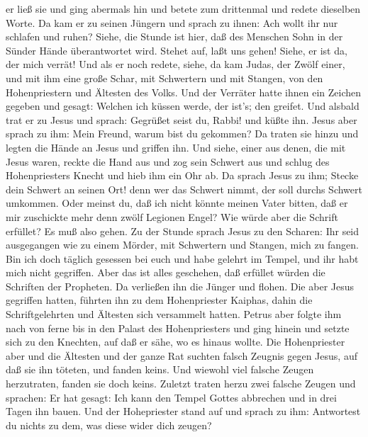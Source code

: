 er ließ sie und ging abermals hin und betete zum drittenmal und redete
dieselben Worte.  Da kam er zu seinen Jüngern und sprach zu
ihnen: Ach wollt ihr nur schlafen und ruhen? Siehe, die Stunde ist hier,
daß des Menschen Sohn in der Sünder Hände überantwortet wird.
 Stehet auf, laßt uns gehen! Siehe, er ist da, der mich
verrät!  Und als er noch redete, siehe, da kam Judas, der
Zwölf einer, und mit ihm eine große Schar, mit Schwertern und mit
Stangen, von den Hohenpriestern und Ältesten des Volks. 
Und der Verräter hatte ihnen ein Zeichen gegeben und gesagt: Welchen ich
küssen werde, der ist's; den greifet.  Und alsbald trat er
zu Jesus und sprach: Gegrüßet seist du, Rabbi! und küßte ihn.
 Jesus aber sprach zu ihm: Mein Freund, warum bist du
gekommen? Da traten sie hinzu und legten die Hände an Jesus und griffen
ihn.  Und siehe, einer aus denen, die mit Jesus waren,
reckte die Hand aus und zog sein Schwert aus und schlug des
Hohenpriesters Knecht und hieb ihm ein Ohr ab.  Da sprach
Jesus zu ihm; Stecke dein Schwert an seinen Ort! denn wer das Schwert
nimmt, der soll durchs Schwert umkommen.  Oder meinst du,
daß ich nicht könnte meinen Vater bitten, daß er mir zuschickte mehr
denn zwölf Legionen Engel?  Wie würde aber die Schrift
erfüllet? Es muß also gehen.  Zu der Stunde sprach Jesus zu
den Scharen: Ihr seid ausgegangen wie zu einem Mörder, mit Schwertern
und Stangen, mich zu fangen. Bin ich doch täglich gesessen bei euch und
habe gelehrt im Tempel, und ihr habt mich nicht gegriffen. 
Aber das ist alles geschehen, daß erfüllet würden die Schriften der
Propheten. Da verließen ihn die Jünger und flohen.  Die
aber Jesus gegriffen hatten, führten ihn zu dem Hohenpriester Kaiphas,
dahin die Schriftgelehrten und Ältesten sich versammelt hatten.
 Petrus aber folgte ihm nach von ferne bis in den Palast
des Hohenpriesters und ging hinein und setzte sich zu den Knechten, auf
daß er sähe, wo es hinaus wollte.  Die Hohenpriester aber
und die Ältesten und der ganze Rat suchten falsch Zeugnis gegen Jesus,
auf daß sie ihn töteten,  und fanden keins. Und wiewohl
viel falsche Zeugen herzutraten, fanden sie doch keins. Zuletzt traten
herzu zwei falsche Zeugen  und sprachen: Er hat gesagt: Ich
kann den Tempel Gottes abbrechen und in drei Tagen ihn bauen.
 Und der Hohepriester stand auf und sprach zu ihm:
Antwortest du nichts zu dem, was diese wider dich zeugen? 
